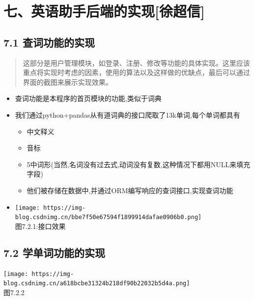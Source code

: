 \documentclass[
]{article}
\begin{document}
\hypertarget{ux4e03ux82f1ux8bedux52a9ux624bux540eux7aefux7684ux5b9eux73b0ux5f90ux8d85ux4fe1}{%
\section{七、英语助手后端的实现{[}徐超信{]}}\label{ux4e03ux82f1ux8bedux52a9ux624bux540eux7aefux7684ux5b9eux73b0ux5f90ux8d85ux4fe1}}

\hypertarget{71-ux67e5ux8bcdux529fux80fdux7684ux5b9eux73b0}{%
\subsection{7.1
查词功能的实现}\label{71-ux67e5ux8bcdux529fux80fdux7684ux5b9eux73b0}}

\begin{quote}
这部分是用户管理模块，如登录、注册、修改等功能的具体实现。这里应该重点将实现时考虑的因素，使用的算法以及这样做的优缺点，最后可以通过界面的截图来展示实现效果。
\end{quote}

\begin{itemize}
\item
  查词功能是本程序的首页模块的功能,类似于词典
\item
  我们通过python+pandas从有道词典的接口爬取了13k单词,每个单词都具有

  \begin{itemize}
  \item
    中文释义
  \item
    音标
  \item
    5中词形(当然,名词没有过去式,动词没有复数,这种情况下都用NULL来填充字段)
  \item
    他们被存储在数据中,并通过ORM编写响应的查词接口,实现查词功能
  \end{itemize}
\item
  \texttt{[image: https://img-blog.csdnimg.cn/bbe7f50e67594f1899914dafae0906b0.png]}\\
  图7.2.1:接口效果
\end{itemize}

\hypertarget{72-ux5b66ux5355ux8bcdux529fux80fdux7684ux5b9eux73b0}{%
\subsection{7.2
学单词功能的实现}\label{72-ux5b66ux5355ux8bcdux529fux80fdux7684ux5b9eux73b0}}

\texttt{[image: https://img-blog.csdnimg.cn/a618bcbe31324b218df90b22032b5d4a.png]}\\
图7.2.2
\end{document}
